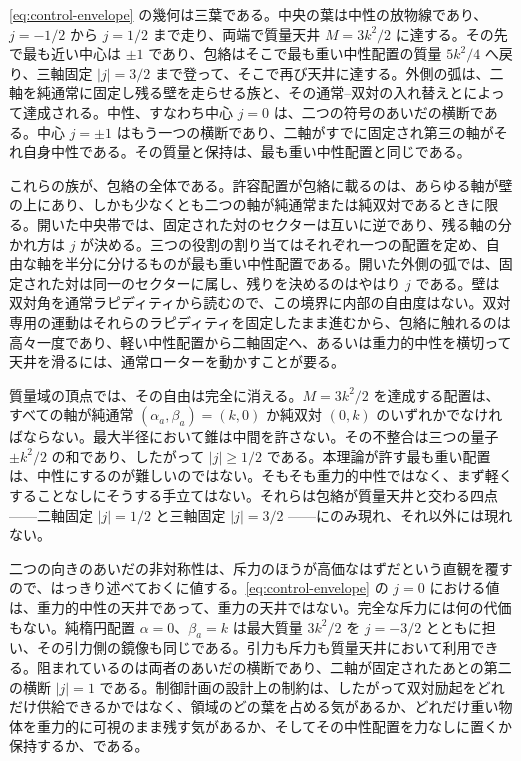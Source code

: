 \documentclass[a4paper]{article}
\begin{document}
\eqref{eq:control-envelope} の幾何は三葉である。中央の葉は中性の放物線であり、$j=-1/2$ から $j=1/2$ まで走り、両端で質量天井 $M=3k^2/2$ に達する。その先で最も近い中心は $\pm 1$ であり、包絡はそこで最も重い中性配置の質量 $5k^2/4$ へ戻り、三軸固定 $|j|=3/2$ まで登って、そこで再び天井に達する。外側の弧は、二軸を純通常に固定し残る壁を走らせる族と、その通常--双対の入れ替えとによって達成される。中性、すなわち中心 $j=0$ は、二つの符号のあいだの横断である。中心 $j=\pm 1$ はもう一つの横断であり、二軸がすでに固定され第三の軸がそれ自身中性である。その質量と保持は、最も重い中性配置と同じである。

これらの族が、包絡の全体である。許容配置が包絡に載るのは、あらゆる軸が壁の上にあり、しかも少なくとも二つの軸が純通常または純双対であるときに限る。開いた中央帯では、固定された対のセクターは互いに逆であり、残る軸の分かれ方は $j$ が決める。三つの役割の割り当てはそれぞれ一つの配置を定め、自由な軸を半分に分けるものが最も重い中性配置である。開いた外側の弧では、固定された対は同一のセクターに属し、残りを決めるのはやはり $j$ である。壁は双対角を通常ラピディティから読むので、この境界に内部の自由度はない。双対専用の運動はそれらのラピディティを固定したまま進むから、包絡に触れるのは高々一度であり、軽い中性配置から二軸固定へ、あるいは重力的中性を横切って天井を滑るには、通常ローターを動かすことが要る。

質量域の頂点では、その自由は完全に消える。$M=3k^2/2$ を達成する配置は、すべての軸が純通常 $(\alpha_a,\beta_a)=(k,0)$ か純双対 $(0,k)$ のいずれかでなければならない。最大半径において錐は中間を許さない。その不整合は三つの量子 $\pm k^2/2$ の和であり、したがって $|j|\ge 1/2$ である。本理論が許す最も重い配置は、中性にするのが難しいのではない。そもそも重力的中性ではなく、まず軽くすることなしにそうする手立てはない。それらは包絡が質量天井と交わる四点——二軸固定 $|j|=1/2$ と三軸固定 $|j|=3/2$ ——にのみ現れ、それ以外には現れない。

二つの向きのあいだの非対称性は、斥力のほうが高価なはずだという直観を覆すので、はっきり述べておくに値する。\eqref{eq:control-envelope} の $j=0$ における値は、重力的中性の天井であって、重力の天井ではない。完全な斥力には何の代価もない。純楕円配置 $\alpha=0$、$\beta_a=k$ は最大質量 $3k^2/2$ を $j=-3/2$ とともに担い、その引力側の鏡像も同じである。引力も斥力も質量天井において利用できる。阻まれているのは両者のあいだの横断であり、二軸が固定されたあとの第二の横断 $|j|=1$ である。制御計画の設計上の制約は、したがって双対励起をどれだけ供給できるかではなく、領域のどの葉を占める気があるか、どれだけ重い物体を重力的に可視のまま残す気があるか、そしてその中性配置を力なしに置くか保持するか、である。
\end{document}
